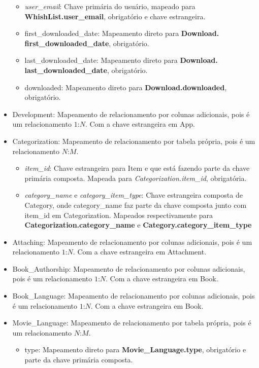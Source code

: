 \documentclass[a4paper, 11pt]{article}
\begin{document}
\begin{itemize}
\begin{itemize}
        \item {\textit{user\_email}}: Chave primária do usuário, mapeado para {\textbf{WhishList.user\_email}}, obrigatório e chave estrangeira.
        \item first\_downloaded\_date: Mapeamento direto para  {\textbf{Download. \\ first\_downloaded\_date}}, obrigatório.
        \item last\_downloaded\_date: Mapeamento direto para  {\textbf{Download. \\ last\_downloaded\_date}}, obrigatório.
        \item downloaded: Mapeamento direto para  {\textbf{Download.downloaded}}, obrigatório.
    \end{itemize}
    \item Development: Mapeamento de relacionamento por colunas adicionais, pois é um relacionamento $1$:$N$. Com a chave estrangeira em App.
    \item Categorization: Mapeamento de relacionamento por tabela própria, pois é um relacionamento $N$:$M$.
    \begin{itemize}
        \item {\textit{item\_id}}: Chave estrangeira para Item e que está fazendo parte da chave primária composta. Mapeada para {\textit{Categorization.item\_id}}, obrigatória.
        \item {\textit{category\_name}} e {\textit{category\_item\_type}}: Chave estrangeira composta de Category, onde category\_name faz parte da chave composta junto com item\_id em Categorization. Mapeados respectivamente para {\textbf{Categorization.category\_name}} e {\textbf{Category.category\_item\_type}}
    \end{itemize}
    \item Attaching: Mapeamento de relacionamento por colunas adicionais, pois é um relacionamento $1$:$N$. Com a chave estrangeira em Attachment.
    \item Book\_Authorship: Mapeamento de relacionamento por colunas adicionais, pois é um relacionamento $1$:$N$. Com a chave estrangeira em Book.
    \item Book\_Language: Mapeamento de relacionamento por colunas adicionais, pois é um relacionamento $1$:$N$. Com a chave estrangeira em Book.
    \item Movie\_Language: Mapeamento de relacionamento por tabela própria, pois é um relacionamento $N$:$M$.
    \begin{itemize}
        \item type: Mapeamento direto para {\textbf{Movie\_Language.type}}, obrigatório e parte da chave primária composta.

\end{itemize}
\end{itemize}
\end{document}
